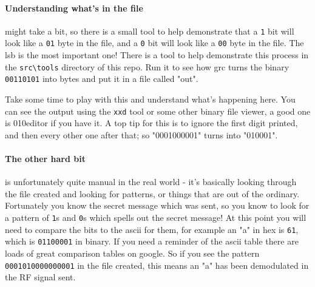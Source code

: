 \paragraph*{Understanding what's in the file} might take a bit, so there is a small tool to help demonstrate that a \verb|1| bit  will look like a \verb|01| byte in the file, and a \verb|0| bit will look like a \verb|00| byte in the file. The \gls{lsb} is the most important one! There is a tool to help demonstrate this process in the \verb|src\tools| directory of this \gls{repo}. Run it  to see how \gls{grc} turns the binary  \verb|00110101| into bytes and put it in a file called "out". 



Take some time to play with this and understand what's happening here. You can see the output using the \verb|xxd| tool or some other binary file viewer, a good one is 010editor if you have it. A top tip for this is to ignore the first digit printed, and then every other one after that; so "0001000001" turns into "010001".


\paragraph*{The other hard bit} is unfortunately quite manual in the real world - it's basically looking through the file created and looking for patterns, or things that are out of the ordinary. Fortunately you know the secret message which was sent, so you know to look for a pattern of \verb|1|s and \verb|0|s which spells out the secret message! At this point you will need to compare the bits to the \gls{ascii} for them, for example an "a" in hex is \verb|61|, which is \verb|01100001| in binary. If you need a reminder of the \gls{ascii} table there are loads of great comparison tables on google. So if you see the pattern \verb|0001010000000001| in the file created, this means an "a" has been demodulated in the \gls{RF} signal sent.


